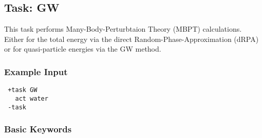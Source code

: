 \documentclass[bibliography=totocnumbered,a4paper,10pt,oneside]{scrbook}
\begin{document}
\subsection{Task: GW}
This task performs Many-Body-Perturbtaion Theory (MBPT) calculations. Either for the total energy via the direct Random-Phase-Approximation (dRPA) or for quasi-particle energies via the GW method. 
\subsubsection{Example Input}
\begin{lstlisting}
 +task GW
   act water
 -task
\end{lstlisting}
\subsubsection{Basic Keywords}
\end{document}
